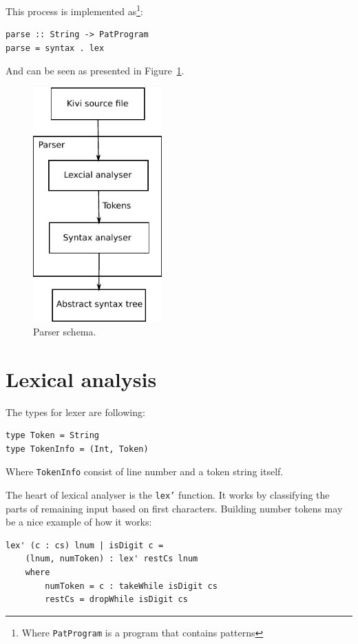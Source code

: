 \documentclass[12pt,a4paper]{report}
\begin{document}
This process is implemented as\footnote{Where \texttt{PatProgram} is a program
that contains patterns}:

\vspace*{0.2in}
\begin{lstlisting}
parse :: String -> PatProgram
parse = syntax . lex
\end{lstlisting}

And can be seen as presented in Figure~\ref{fig:parser}.

\vspace*{0.2in}
\begin{figure}[h!]
  \centering
  \includegraphics[height=9cm]{parser}
  \caption{Parser schema.}
  \label{fig:parser}
\end{figure}

\section{Lexical analysis}

The types for lexer are following:

\vspace*{0.2in}
\begin{lstlisting}
type Token = String
type TokenInfo = (Int, Token)
\end{lstlisting}
Where \texttt{TokenInfo} consist of line number and a token string itself.

The heart of lexical analyser is the \texttt{lex'} function. It works by
classifying the parts of remaining input based on first characters.  Building
number tokens may be a nice example of how it works:

\vspace*{0.2in}
\begin{lstlisting}[label=lst:lex_comment,caption={Building tokens from numbers.}]
lex' (c : cs) lnum | isDigit c =
    (lnum, numToken) : lex' restCs lnum
    where
        numToken = c : takeWhile isDigit cs
        restCs = dropWhile isDigit cs
\end{lstlisting}
\end{document}
